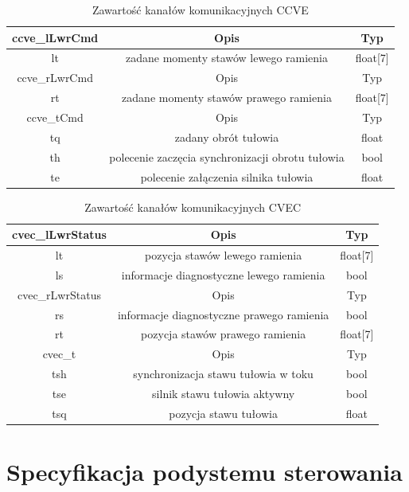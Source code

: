 \documentclass[]{article}
\begin{document}
\begin{table}[H]
	\begin{tabular}{||c|cc||}
		\hline\hline
		ccve\_lLwrCmd & Opis & Typ \\
		\hline\hline

		lt & zadane momenty stawów lewego ramienia & float[7] \\
		\hline\hline
		ccve\_rLwrCmd & Opis & Typ \\
		\hline\hline

		rt & zadane momenty stawów prawego ramienia & float[7] \\
		\hline\hline
		ccve\_tCmd & Opis & Typ \\
		\hline\hline
		tq & zadany obrót tułowia & float \\
		th & polecenie zaczęcia synchronizacji obrotu tułowia & bool \\
		te & polecenie załączenia silnika tułowia & float \\
		\hline
	\end{tabular}
	\label{tab:ccve}
	\caption{Zawartość kanałów komunikacyjnych CCVE}
\end{table}

\begin{table}[H]
	\begin{tabular}{||c|cc||}
		\hline\hline
		cvec\_lLwrStatus & Opis & Typ \\
		\hline\hline
		lt & pozycja stawów lewego ramienia & float[7] \\
		ls & informacje diagnostyczne lewego ramienia & bool \\
		\hline\hline
		cvec\_rLwrStatus & Opis & Typ \\
		\hline\hline
		rs & informacje diagnostyczne prawego ramienia & bool \\
		rt & pozycja stawów prawego ramienia & float[7] \\
		\hline\hline
		cvec\_t & Opis & Typ \\
		\hline\hline
		tsh & synchronizacja stawu tułowia w toku & bool \\
		tse & silnik stawu tułowia aktywny & bool \\
		tsq & pozycja stawu tułowia & float \\
		\hline
	\end{tabular}
	\label{tab:cvec}
	\caption{Zawartość kanałów komunikacyjnych CVEC}
\end{table}


\section{Specyfikacja podystemu sterowania}
\end{document}
